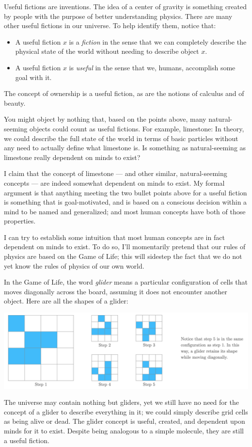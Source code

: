 \documentclass[11pt, oneside]{article}
\theoremstyle{argtstyle}
\begin{document}
Useful fictions are inventions.
The idea of a center of gravity is something created by
people with the purpose of better understanding physics.
There are many other useful fictions in our universe. To help identify them,
notice that:
\begin{itemize}
    \item A useful fiction $x$ is a {\em fiction}
        in the sense that we can completely
        describe the physical state of the world without needing to describe
        object $x$.
    \item A useful fiction $x$ is {\em useful} in the sense that we, humans,
        accomplish some goal with it.
\end{itemize}
The concept of ownership is a useful fiction, as are the notions of
calculus and of beauty.

You might object by nothing that, based on the points above,
many natural-seeming objects could count as useful fictions.
For example, limestone: In theory, we could describe the full state of the world
in terms of basic particles without any need to actually
define what limestone is. Is something as natural-seeming as limestone really
dependent on minds to exist?

I claim that the concept of limestone --- and other similar, natural-seeming
concepts --- are indeed somewhat dependent on minds to exist.
My formal argument is that anything meeting the two bullet points above for a
useful fiction is something that is goal-motivated, and is based on a conscious
decision within a mind to be named and generalized; and most human concepts have
both of those properties.

I can try to establish some intuition that most human concepts are in fact
dependent on minds to exist. To do so, I'll momentarily pretend that our rules
of physics are based on the Game of Life; this will sidestep the fact that we do
not yet know the rules of physics of our own world.

In the Game of Life, the word {\em glider} means a particular 
configuration of cells that moves diagonally across the board, assuming it does
not encounter another object.
% 
% 
Here are all the shapes of a glider:
\begin{center}
\includegraphics[width=14cm]{glider2.png}
\end{center}
The universe may contain nothing but gliders, yet we still have no need
for the concept of a glider to describe everything in it; we could simply
describe grid cells as being alive or dead.
The glider concept is useful, created, and dependent upon minds for it to
exist. Despite being analogous to a simple molecule, they are still a useful
fiction.
\end{document}
